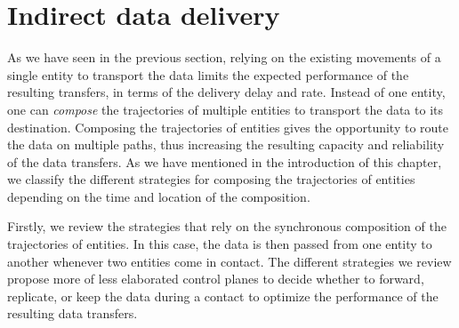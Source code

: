 

\section{Indirect data delivery}
\label{sec:indirect-delivery}

As we have seen in the previous section, relying on the existing movements of a single entity to transport the data limits the expected performance of the resulting transfers, in terms of the delivery delay and rate. Instead of one entity, one can \textit{compose} the trajectories of multiple entities to transport the data to its destination. Composing the trajectories of entities gives the opportunity to route the data on multiple paths, thus increasing the resulting capacity and reliability of the data transfers. As we have mentioned in the introduction of this chapter, we classify the different strategies for composing the trajectories of entities depending on the time and location of the composition. 

Firstly, we review the strategies that rely on the synchronous composition of the trajectories of entities. In this case, the data is then passed from one entity to another whenever two entities come in contact. The different strategies we review propose more of less elaborated control planes to decide whether to forward, replicate, or keep the data during a contact to optimize the performance of the resulting data transfers.

